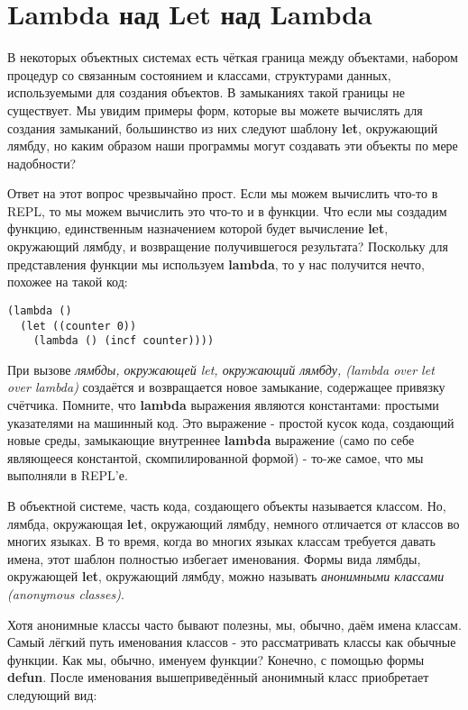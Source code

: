 \section{Lambda над Let над Lambda}\label{section_lambda_over_let_over_lambda}

В некоторых объектных системах есть чёткая граница между объектами, набором процедур со связанным состоянием и классами, структурами данных, используемыми для создания объектов. В замыканиях такой границы не существует. Мы увидим примеры форм, которые вы можете вычислять для создания замыканий, большинство из них следуют шаблону \textbf{let}, окружающий лямбду, но каким образом наши программы могут создавать эти объекты по мере надобности?

Ответ на этот вопрос чрезвычайно прост. Если мы можем вычислить что-то в REPL, то мы можем вычислить это что-то и в функции. Что если мы создадим функцию, единственным назначением которой будет вычисление \textbf{let}, окружающий лямбду, и возвращение получившегося результата? Поскольку для представления функции мы используем \textbf{lambda}, то у нас получится нечто, похожее на такой код:

\begin{verbatim}
(lambda ()
  (let ((counter 0))
    (lambda () (incf counter))))
\end{verbatim}

При вызове \emph{лямбды, окружающей let, окружающий лямбду, (lambda over let over lambda)} создаётся и возвращается новое замыкание, содержащее привязку счётчика. Помните, что \textbf{lambda} выражения являются константами: простыми указателями на машинный код. Это выражение - простой кусок кода, создающий новые среды, замыкающие внутреннее \textbf{lambda} выражение (само по себе являющееся константой, скомпилированной формой) - то-же самое, что мы выполняли в REPL'е.

В объектной системе, часть кода, создающего объекты называется классом. Но, лямбда, окружающая \textbf{let}, окружающий лямбду, немного отличается от классов во многих языках. В то время, когда во многих языках классам требуется давать имена, этот шаблон полностью избегает именования. Формы вида лямбды, окружающей \textbf{let}, окружающий лямбду, можно называть \emph{анонимными классами (anonymous classes)}.

Хотя анонимные классы часто бывают полезны, мы, обычно, даём имена классам. Самый лёгкий путь именования классов - это рассматривать классы как обычные функции. Как мы, обычно, именуем функции? Конечно, с помощью формы \textbf{defun}. После именования вышеприведённый анонимный класс приобретает следующий вид:

